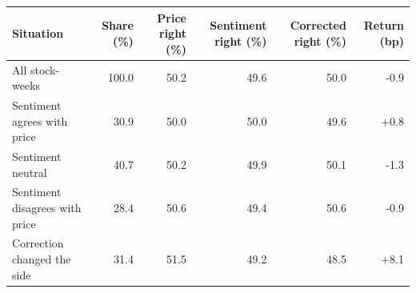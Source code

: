 \begin{tabular}{lrrrrr}
\toprule
Situation & Share (\%) & Price right (\%) & Sentiment right (\%) & Corrected right (\%) & Return (bp) \\
\midrule
All stock-weeks & 100.0 & 50.2 & 49.6 & 50.0 & -0.9 \\
\midrule
Sentiment agrees with price & 30.9 & 50.0 & 50.0 & 49.6 & +0.8 \\
Sentiment neutral & 40.7 & 50.2 & 49.9 & 50.1 & -1.3 \\
Sentiment disagrees with price & 28.4 & 50.6 & 49.4 & 50.6 & -0.9 \\
Correction changed the side & 31.4 & 51.5 & 49.2 & 48.5 & +8.1 \\
\bottomrule
\end{tabular}
